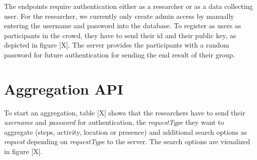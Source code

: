 The endpoints require authentication either as a researcher or as a data collecting user. For the researcher, we currently only create admin access by manually entering the username and password into the database. To register as users as participants in the crowd, they have to send their id and their public key, as depicted in figure [X]. The server provides the participants with a random password for future authentication for sending the end result of their group.

\section{Aggregation API}

To start an aggregation, table [X] shows that the researchers have to send their \textit{username} and \textit{password} for authentication, the \textit{requestType} they want to aggregate (steps, activity, location or presence) and additional search options as \textit{request} depending on \textit{requestType} to the server. The search options are visualized in figure [X].

